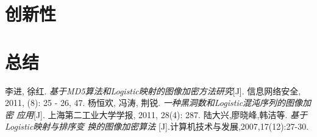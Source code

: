 \documentclass[12pt, titlepage]{ctexrep}
\begin{document}
\chapter{创新性}
\label{chap:creativity}

\chapter{总结}
\label{chap:summary}


\begin{thebibliography}{9}
 李进, 徐红.
 \emph{基于MD5算法和Logistic映射的图像加密方法研究}[J]. 信息网络安全,
 2011, (8): 25 - 26, 47.
 杨恒欢, 冯涛, 荆锐. \emph{一种黑洞数和Logistic混沌序列的图像加密
  应用}[J]. 上海第二工业大学学报, 2011, 28(4): 287.
 陆大兴,廖晓峰,韩洁等. \emph{基于Logistic映射与排序变
    换的图像加密算法}
[J].计算机技术与发展,2007,17(12):27-30.
\end{thebibliography}
\end{document}
